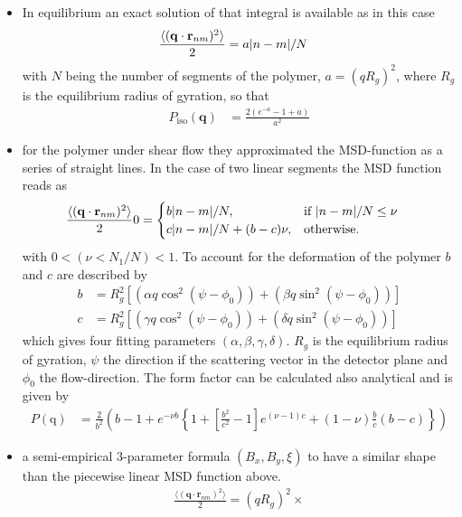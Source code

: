 \begin{itemize}
\item In equilibrium an exact solution of that integral is available as in this case
\begin{align}
  \frac{\langle(\mathbf{q}\cdot\mathbf{r}_{nm})^2\rangle}{2} & = a \abs{n-m}/N
\end{align}
with $N$ being the number of segments of the polymer, $a=(qR_g)^2$, where $R_g$ is the equilibrium radius of gyration, so that
\begin{align}
  P_\mathrm{iso}(\mathbf{q}) & = \frac{2\left(e^{-a}-1+a\right)}{a^2}
\end{align}
\item for the polymer under shear flow they approximated the MSD-function as a series of straight lines. In the case of two linear segments the MSD function reads as
    \begin{align}
      \frac{\langle(\mathbf{q}\cdot\mathbf{r}_{nm})^2\rangle}{2}0 &=
      \begin{cases}
        b\abs{n-m}/N, & \mbox{if } \abs{n-m}/N \leq \nu \\
        c\abs{n-m}/N+(b-c)\nu, & \mbox{otherwise}.
      \end{cases}
    \end{align}
    with $0<(\nu<N_1/N)<1$. To account for the deformation of the polymer $b$ and $c$ are described by
    \begin{align}
      b &= R_g^2\left[(\alpha q \cos^2(\psi-\phi_0))+(\beta q \sin^2(\psi-\phi_0))\right] \\
      c &= R_g^2\left[(\gamma q \cos^2(\psi-\phi_0))+(\delta q \sin^2(\psi-\phi_0))\right]
    \end{align}
    which gives four fitting parameters $(\alpha,\beta,\gamma,\delta)$. $R_g$ is the equilibrium radius of gyration, $\psi$ the direction if the scattering vector in the detector plane and $\phi_0$ the flow-direction. The form factor can be calculated also analytical and is given by
    \begin{align}
      P(\mathrm{q}) & = \frac{2}{b^2}\left(b-1+e^{-\nu b} \left\{1+\left[\frac{b^2}{c^2}-1\right]e^{(\nu-1)c}+
                        (1-\nu)\frac{b}{c}(b-c)\right\}\right)
    \end{align}
\item  a semi-empirical 3-parameter formula $(B_x,B_y,\xi)$ to have a similar shape than the piecewise linear MSD function above.
    \begin{multline}
    \frac{\langle(\mathbf{q}\cdot\mathbf{r}_{nm})^2\rangle}{2} =\left(qR_g\right)^2 \times \\

\end{multline}
\end{itemize}
